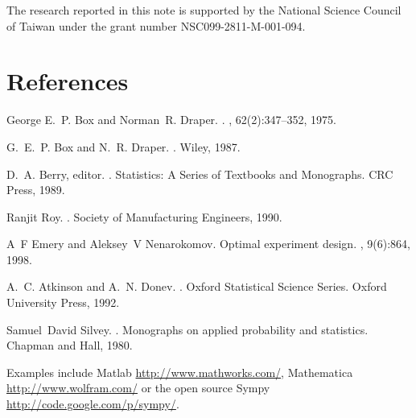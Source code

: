 \documentclass[12pt]{iopart}
\begin{document}
The research reported in this note is supported by the National Science Council of Taiwan under the grant number NSC099-2811-M-001-094.

\section*{References}
%
%

\begin{thebibliography}{1}

George E.~P. Box and Norman~R. Draper.
.
, 62(2):347--352, 1975.

G.~E.~P. Box and N.~R. Draper.
.
\newblock Wiley, 1987.

D.~A. Berry, editor.
.
\newblock Statistics: A Series of Textbooks and Monographs. CRC Press, 1989.

Ranjit Roy.
.
\newblock Society of Manufacturing Engineers, 1990.

A~F Emery and Aleksey~V Nenarokomov.
\newblock Optimal experiment design.
, 9(6):864, 1998.

A.~C. Atkinson and A.~N. Donev.
.
\newblock Oxford Statistical Science Series. Oxford University Press, 1992.

Samuel~David Silvey.
.
\newblock Monographs on applied probability and statistics. Chapman and Hall,
  1980.

Examples include Matlab \url{http://www.mathworks.com/}, Mathematica \url{http://www.wolfram.com/} or the open source Sympy \url{http://code.google.com/p/sympy/}.

\end{thebibliography}
\end{document}
